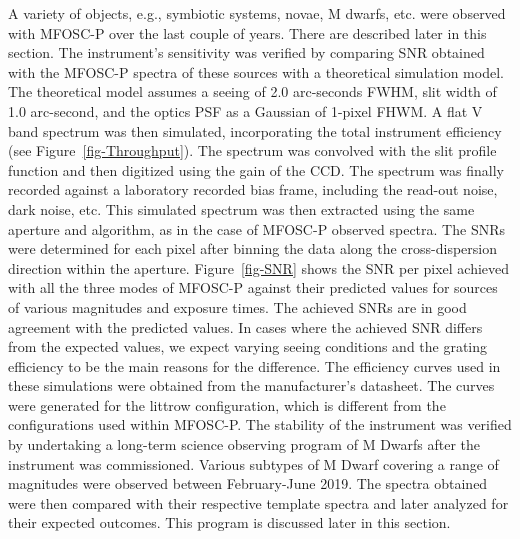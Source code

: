 A variety of objects, e.g., symbiotic systems, novae, M dwarfs, etc. were observed with MFOSC-P over the last couple of years. There are described later in this section. The instrument's sensitivity was verified by comparing SNR obtained with the MFOSC-P spectra of these sources with a theoretical simulation model. The theoretical model assumes a seeing of 2.0 arc-seconds FWHM, slit width of 1.0 arc-second, and the optics PSF as a Gaussian of 1-pixel FHWM. A flat V band spectrum was then simulated, incorporating the total instrument efficiency (see Figure~\ref{fig-Throughput}). The spectrum was convolved with the slit profile function and then digitized using the gain of the CCD. The spectrum was finally recorded against a laboratory recorded bias frame, including the read-out noise, dark noise, etc. This simulated spectrum was then extracted using the same aperture and algorithm, as in the case of MFOSC-P observed spectra. The SNRs were determined for each pixel after binning the data along the cross-dispersion direction within the aperture. Figure~\ref{fig-SNR} shows the SNR per pixel achieved with all the three modes of MFOSC-P against their predicted values for sources of various magnitudes and exposure times. The achieved SNRs are in good agreement with the predicted values. In cases where the achieved SNR differs from the expected values, we expect varying seeing conditions and the grating efficiency to be the main reasons for the difference. The efficiency curves used in these simulations were obtained from the manufacturer's datasheet. The curves were generated for the littrow configuration, which is different from the configurations used within MFOSC-P. The stability of the instrument was verified by undertaking a long-term science observing program of M Dwarfs after the instrument was commissioned. Various subtypes of M Dwarf covering a range of magnitudes were observed between February-June 2019. The spectra obtained were then compared with their respective template spectra and later analyzed for their expected outcomes. This program is discussed later in this section.   
\par 
